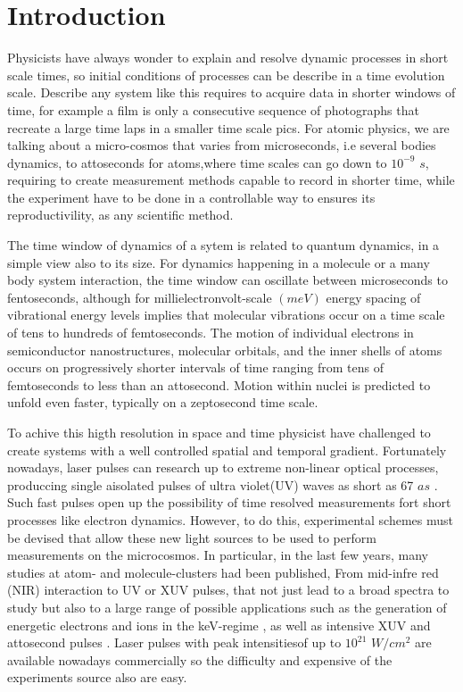 \section{Introduction}

Physicists have always wonder to explain and resolve dynamic processes in short scale times, so initial conditions of processes can be  describe in a time  evolution scale. Describe any system like this requires to acquire data in shorter windows of time, for example a film is only a consecutive sequence of  photographs that recreate a large time laps in a smaller time scale pics. For  atomic physics, we are talking about a micro-cosmos that varies from microseconds, i.e several bodies dynamics, to  attoseconds  for atoms,where time scales can go down to $10^{-9}$ $s$, requiring to create measurement methods capable to record in shorter time, while the experiment have to be done in a controllable way to ensures its reproductivility, as any scientific method.

The time window of dynamics of a sytem is related to  quantum dynamics, in a simple view also to its size. For dynamics happening in a molecule or a many body system interaction, the time window can oscillate between  microseconds to fentoseconds, although for millielectronvolt-scale $(meV)$ energy spacing of vibrational energy levels implies that molecular vibrations occur on a time scale of tens to hundreds of femtoseconds. The motion of individual electrons in semiconductor nanostructures, molecular orbitals, and the inner shells of atoms occurs on progressively shorter intervals of time ranging from tens of femtoseconds to less than an attosecond. Motion within nuclei is predicted to unfold even faster, typically on a zeptosecond time scale.

To achive this higth resolution in space and  time physicist have challenged to create systems with a well controlled spatial and temporal gradient. Fortunately nowadays, laser pulses can research up to extreme non-linear optical processes, produccing single aisolated  pulses of ultra violet(UV) waves as short as 67 $as$ \cite{zhao_tailoring_2012}.  Such fast pulses open up the possibility of time resolved measurements fort short processes like electron dynamics.  However, to do this, experimental schemes must be devised that allow these new light sources to be used to perform measurements on the microcosmos. In particular, in the last few years,  many studies at atom- and molecule-clusters had been published, From mid-infre red (NIR) interaction to UV or XUV pulses, that not just lead to a broad spectra to study but also to a large range of possible applications such as the generation of  energetic electrons and ions in the keV-regime \cite{fennel_laser-driven_2010}, as well as intensive XUV and attosecond pulses \cite{stebbings_generation_2011}. Laser pulses with peak intensitiesof up to $10^{21}$ $W/cm^{2}$  are available nowadays \cite{mikaberidze_atomic_1981} commercially so the difficulty and expensive of the experiments source also are easy.

